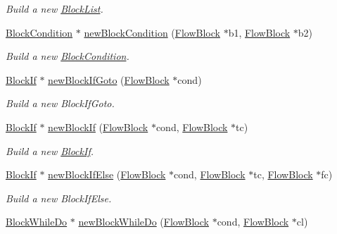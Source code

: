 \begin{DoxyCompactItemize}
\begin{DoxyCompactList}\small\item\em Build a new \mbox{\hyperlink{class_block_list}{Block\+List}}. \end{DoxyCompactList}\item 
\mbox{\hyperlink{class_block_condition}{Block\+Condition}} $\ast$ \mbox{\hyperlink{class_block_graph_a9b468774a4463d9abc43c21d032a850b}{new\+Block\+Condition}} (\mbox{\hyperlink{class_flow_block}{Flow\+Block}} $\ast$b1, \mbox{\hyperlink{class_flow_block}{Flow\+Block}} $\ast$b2)
\begin{DoxyCompactList}\small\item\em Build a new \mbox{\hyperlink{class_block_condition}{Block\+Condition}}. \end{DoxyCompactList}\item 
\mbox{\hyperlink{class_block_if}{Block\+If}} $\ast$ \mbox{\hyperlink{class_block_graph_ad25eb345760dc1732c0117f7bb0a72ce}{new\+Block\+If\+Goto}} (\mbox{\hyperlink{class_flow_block}{Flow\+Block}} $\ast$cond)
\begin{DoxyCompactList}\small\item\em Build a new Block\+If\+Goto. \end{DoxyCompactList}\item 
\mbox{\hyperlink{class_block_if}{Block\+If}} $\ast$ \mbox{\hyperlink{class_block_graph_a76871ba6558fd5899d92cb5bfb6d9b60}{new\+Block\+If}} (\mbox{\hyperlink{class_flow_block}{Flow\+Block}} $\ast$cond, \mbox{\hyperlink{class_flow_block}{Flow\+Block}} $\ast$tc)
\begin{DoxyCompactList}\small\item\em Build a new \mbox{\hyperlink{class_block_if}{Block\+If}}. \end{DoxyCompactList}\item 
\mbox{\hyperlink{class_block_if}{Block\+If}} $\ast$ \mbox{\hyperlink{class_block_graph_acea0ea1a425020062f5d6e3b87a69fe0}{new\+Block\+If\+Else}} (\mbox{\hyperlink{class_flow_block}{Flow\+Block}} $\ast$cond, \mbox{\hyperlink{class_flow_block}{Flow\+Block}} $\ast$tc, \mbox{\hyperlink{class_flow_block}{Flow\+Block}} $\ast$fc)
\begin{DoxyCompactList}\small\item\em Build a new Block\+If\+Else. \end{DoxyCompactList}\item 
\mbox{\hyperlink{class_block_while_do}{Block\+While\+Do}} $\ast$ \mbox{\hyperlink{class_block_graph_af1dfcc22ff51892b053cfe62cc7bf124}{new\+Block\+While\+Do}} (\mbox{\hyperlink{class_flow_block}{Flow\+Block}} $\ast$cond, \mbox{\hyperlink{class_flow_block}{Flow\+Block}} $\ast$cl)

\end{DoxyCompactItemize}
